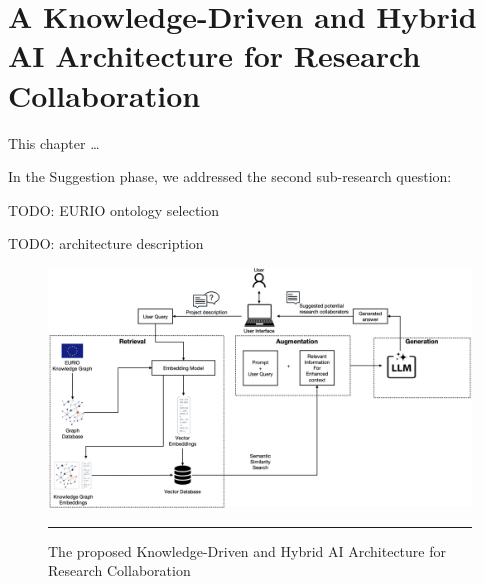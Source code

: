 \chapter{A Knowledge-Driven and Hybrid AI Architecture for Research Collaboration}\label{chap:Knowledge-DrivenArchitecture}
This chapter \ldots

In the Suggestion phase, we addressed the second sub-research question:
\begin{center}
    \rqTwo
\end{center}

TODO: EURIO ontology selection

TODO: architecture description

\begin{figure}[htbp]
    \centering
 \includegraphics[width=\textwidth]{figures/architecture/proposed-system-graphRAG.png}
     \rule{35em}{0.5pt}
    \caption{The proposed Knowledge-Driven and Hybrid AI Architecture for Research Collaboration}
 \label{fig:proposed-system-graphRAG}
\end{figure}